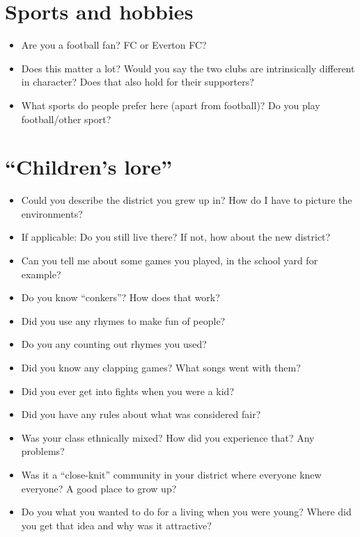	\section*{Sports and hobbies}
	\begin{multicols}{2}
		\begin{itemize}
			\item Are you a football fan?  FC or Everton FC?
			\item Does this matter a lot? Would you say the two clubs are intrinsically different in character? Does that also hold for their supporters?
			\item What sports do people prefer here (apart from football)? Do you play football/other sport?
		\end{itemize}
	\end{multicols}
	
	\section*{``Children’s lore''}
	\begin{multicols}{2}
		\begin{itemize}
			\item Could you describe the district you grew up in? How do I have to picture the environments?
			\item If applicable: Do you still live there? If not, how about the new district?
			\item Can you tell me about some games you played, in the school yard for example?
			\item Do you know ``conkers''? How does that work?
			\item Did you use any rhymes to make fun of people?
			\item Do you  any counting out rhymes you used?
			\item Did you know any clapping games? What songs went with them?
			\item Did you ever get into fights when you were a kid?
			\item Did you have any rules about what was considered fair?
			\item Was your class ethnically mixed? How did you experience that? Any problems?
			\item Was it a ``close-knit'' community in your district where everyone knew everyone? A good place to grow up?
			\item Do you  what you wanted to do for a living when you were young? Where did you get that idea and why was it attractive?
		\end{itemize}
	\end{multicols}
	
